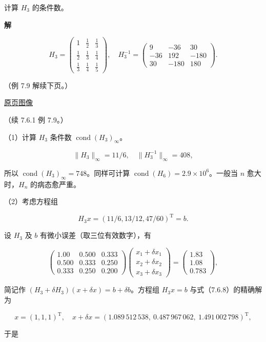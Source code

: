 \documentclass[
  10pt,
  fontset=fandol]{ctexart}
\begin{document}
计算 \(H_3\) 的条件数。

\textbf{解}

\[
H_3=\begin{pmatrix}
1&\frac12&\frac13\\[4pt]
\frac12&\frac13&\frac14\\[4pt]
\frac13&\frac14&\frac15
\end{pmatrix},\quad
H_3^{-1}=\begin{pmatrix}
9&-36&30\\
-36&192&-180\\
30&-180&180
\end{pmatrix}.
\]

（例 7.9 解续下页。）

\href{../../source-images/pdf-208.jpeg}{原页图像}

（续 7.6.1 例 7.9。）

（1）计算 \(H_3\) 条件数 \(\operatorname{cond}(H_3)_\infty\)。

\[
\|H_3\|_\infty=11/6,\quad\|H_3^{-1}\|_\infty=408,
\]

所以 \(\operatorname{cond}(H_3)_\infty=748\)。同样可计算 \(\operatorname{cond}(H_6)=2.9\times10^6\)。一般当 \(n\) 愈大时，\(H_n\) 的病态愈严重。

（2）考虑方程组

\[
H_3x=(11/6,13/12,47/60)^{\mathrm T}=b.
\]

设 \(H_3\) 及 \(b\) 有微小误差（取三位有效数字），有

\[
\begin{pmatrix}
1.00&0.500&0.333\\
0.500&0.333&0.250\\
0.333&0.250&0.200
\end{pmatrix}
\begin{pmatrix}x_1+\delta x_1\\x_2+\delta x_2\\x_3+\delta x_3\end{pmatrix}
=\begin{pmatrix}1.83\\1.08\\0.783\end{pmatrix},
\tag{7.6.8}
\]

简记作 \((H_3+\delta H_3)(x+\delta x)=b+\delta b\)。方程组 \(H_3x=b\) 与式（7.6.8）的精确解为

\[
x=(1,1,1)^{\mathrm T},\quad
x+\delta x=(1.089\,512\,538,\ 0.487\,967\,062,\ 1.491\,002\,798)^{\mathrm T},
\]

于是
\end{document}
